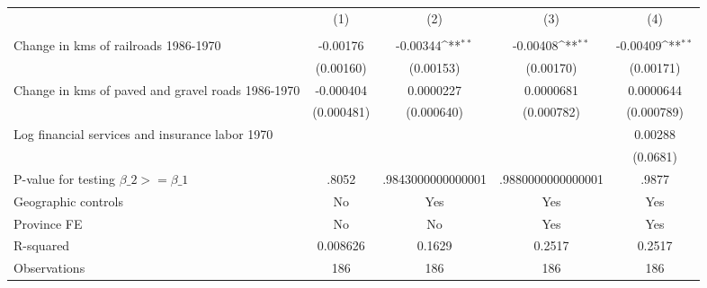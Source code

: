 {
\def\sym#1{\ifmmode^{#1}\else\(^{#1}\)\fi}
\begin{tabular}{l*{4}{c}}
\hline\hline
                &\multicolumn{1}{c}{(1)}&\multicolumn{1}{c}{(2)}&\multicolumn{1}{c}{(3)}&\multicolumn{1}{c}{(4)}\\
                &\multicolumn{1}{c}{}&\multicolumn{1}{c}{}&\multicolumn{1}{c}{}&\multicolumn{1}{c}{}\\
\hline
Change in kms of railroads 1986-1970& -0.00176         & -0.00344\sym{**} & -0.00408\sym{**} & -0.00409\sym{**} \\
                &(0.00160)         &(0.00153)         &(0.00170)         &(0.00171)         \\
[1em]
Change in kms of paved and gravel roads 1986-1970&-0.000404         &0.0000227         &0.0000681         &0.0000644         \\
                &(0.000481)         &(0.000640)         &(0.000782)         &(0.000789)         \\
[1em]
Log financial services and insurance labor 1970&                  &                  &                  &  0.00288         \\
                &                  &                  &                  & (0.0681)         \\
\hline
P-value for testing $\beta\_{2} >= \beta\_{1}$&    .8052         &.9843000000000001         &.9880000000000001         &    .9877         \\
Geographic controls&       No         &      Yes         &      Yes         &      Yes         \\
Province FE     &       No         &       No         &      Yes         &      Yes         \\
R-squared       & 0.008626         &   0.1629         &   0.2517         &   0.2517         \\
Observations    &      186         &      186         &      186         &      186         \\
\hline\hline
\end{tabular}
}

